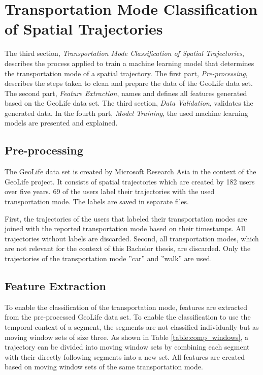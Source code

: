 \section{Transportation Mode Classification of Spatial Trajectories}
The third section, \textit{Transportation Mode Classification of Spatial Trajectories}, describes the process applied to train a machine learning model that determines the transportation mode of a spatial trajectory.
The first part, \textit{Pre-processing}, describes the steps taken to clean and prepare the data of the GeoLife data set.
The second part, \textit{Feature Extraction}, names and defines all features generated based on the GeoLife data set.
The third section, \textit{Data Validation}, validates the generated data.
In the fourth part, \textit{Model Training}, the used machine learning models are presented and explained. 

\subsection{Pre-processing}

The GeoLife data set is created by Microsoft Research Asia in the context of the GeoLife project. It consists of spatial trajectories which are created by 182 users over five years. 69 of the users label their trajectories with the used transportation mode. The labels are saved in separate files. \cite{zheng2008understanding} \cite{zheng2010geolife} \cite{geolife-dataset} \cite{zheng2009mining}

First, the trajectories of the users that labeled their transportation modes are joined with the reported transportation mode based on their timestamps. All trajectories without labels are discarded. Second, all transportation modes, which are not relevant for the context of this Bachelor thesis, are discarded. Only the trajectories of the transportation mode ''car'' and ''walk'' are used.

\subsection{Feature Extraction}

To enable the classification of the transportation mode, features are extracted from the pre-processed GeoLife data set. To enable the classification to use the temporal context of a segment, the segments are not classified individually but as moving window sets of size three. As shown in Table \ref{table:comp_windows}, a trajectory can be divided into moving window sets by combining each segment with their directly following segments into a new set. All features are created based on moving window sets of the same transportation mode. \cite{Bolbol2012}

